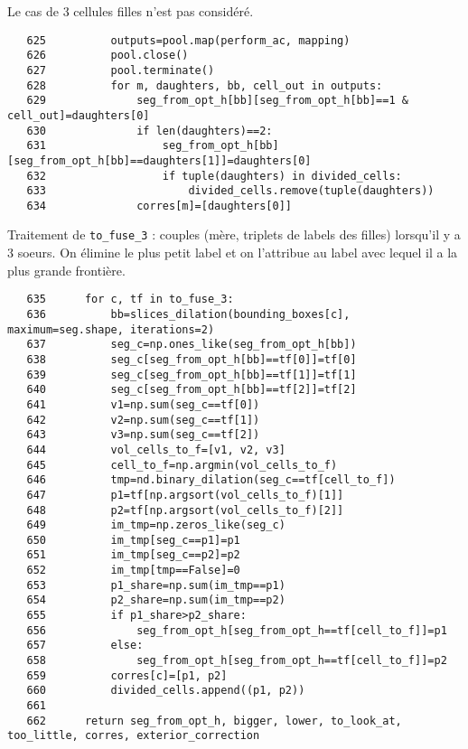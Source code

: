 \documentclass{article}
\def \mycolor {red}
\begin{document}
Le cas de 3 cellules filles n'est pas consid\'er\'e. 
\color{black}
\begin{verbatim}
   625	        outputs=pool.map(perform_ac, mapping)
   626	        pool.close()
   627	        pool.terminate()
   628	        for m, daughters, bb, cell_out in outputs:
   629	            seg_from_opt_h[bb][seg_from_opt_h[bb]==1 & cell_out]=daughters[0]
   630	            if len(daughters)==2:
   631	                seg_from_opt_h[bb][seg_from_opt_h[bb]==daughters[1]]=daughters[0]
   632	                if tuple(daughters) in divided_cells:
   633	                    divided_cells.remove(tuple(daughters))
   634	            corres[m]=[daughters[0]]
\end{verbatim} 
\color{\mycolor}
Traitement de \verb|to_fuse_3| : couples (m\`ere, triplets de labels des filles) lorsqu'il y a 3 soeurs. On \'elimine le plus petit label et on l'attribue au label avec lequel il a la plus grande fronti\`ere.
\color{black}
\begin{verbatim}
   635	    for c, tf in to_fuse_3:
   636	        bb=slices_dilation(bounding_boxes[c], maximum=seg.shape, iterations=2)
   637	        seg_c=np.ones_like(seg_from_opt_h[bb])
   638	        seg_c[seg_from_opt_h[bb]==tf[0]]=tf[0]
   639	        seg_c[seg_from_opt_h[bb]==tf[1]]=tf[1]
   640	        seg_c[seg_from_opt_h[bb]==tf[2]]=tf[2]
   641	        v1=np.sum(seg_c==tf[0])
   642	        v2=np.sum(seg_c==tf[1])
   643	        v3=np.sum(seg_c==tf[2])
   644	        vol_cells_to_f=[v1, v2, v3]
   645	        cell_to_f=np.argmin(vol_cells_to_f)
   646	        tmp=nd.binary_dilation(seg_c==tf[cell_to_f])
   647	        p1=tf[np.argsort(vol_cells_to_f)[1]]
   648	        p2=tf[np.argsort(vol_cells_to_f)[2]]
   649	        im_tmp=np.zeros_like(seg_c)
   650	        im_tmp[seg_c==p1]=p1
   651	        im_tmp[seg_c==p2]=p2
   652	        im_tmp[tmp==False]=0
   653	        p1_share=np.sum(im_tmp==p1)
   654	        p2_share=np.sum(im_tmp==p2)
   655	        if p1_share>p2_share:
   656	            seg_from_opt_h[seg_from_opt_h==tf[cell_to_f]]=p1
   657	        else:
   658	            seg_from_opt_h[seg_from_opt_h==tf[cell_to_f]]=p2
   659	        corres[c]=[p1, p2]
   660	        divided_cells.append((p1, p2))
   661	
   662	    return seg_from_opt_h, bigger, lower, to_look_at, too_little, corres, exterior_correction
\end{verbatim}
\color{\mycolor}
\end{document}
